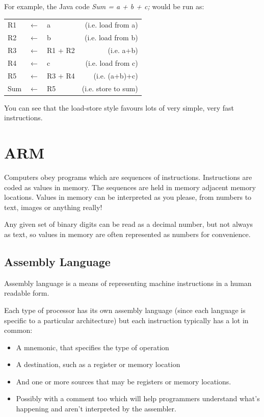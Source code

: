 For example, the Java code {\it Sum = a + b + c;} would be run as:

\begin{center}
    \begin{tabular}{l l l r}
        R1 & $\leftarrow$ & a & (i.e. load from a)\\
        R2 & $\leftarrow$ & b & (i.e. load from b)\\
        R3 & $\leftarrow$ & R1 + R2 & (i.e. a+b)\\
        R4 & $\leftarrow$ & c & (i.e. load from c)\\
        R5 & $\leftarrow$ & R3 + R4  & (i.e. (a+b)+c)\\
        Sum & $\leftarrow$ & R5 & (i.e. store to sum)\\
    \end{tabular}
\end{center}

You can see that the load-store style favours lots of very simple, very fast
instructions.

\section{ARM}

Computers obey programs which are sequences of instructions. Instructions are
coded as values in memory. The sequences are held in memory adjacent memory
locations. Values in memory can be interpreted as you please, from numbers to
text, images or anything really!

Any given set of binary digits can be read as a decimal number, but not always
as text, so values in memory are often represented as numbers for convenience.

\subsection{Assembly Language}

Assembly language is a means of representing machine instructions in a human
readable form.

Each type of processor has its own assembly language (since each language is
specific to a particular architecture) but each instruction typically has a lot
in common:

\begin{itemize}
	\item A mnemonic, that specifies the type of operation
	\item A destination, such as a register or memory location
	\item And one or more sources that may be registers or memory locations.
	\item Possibly with a comment too which will help programmers understand 
	what's happening and aren't interpreted by the assembler.
\end{itemize}

